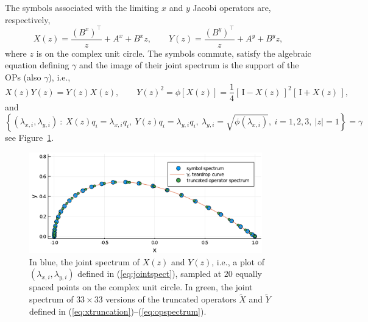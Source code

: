 \documentclass[12pt,a4paper]{article}
\begin{document}
The symbols associated with the limiting $x$ and $y$ Jacobi operators are, respectively,
\begin{equation*}
X(z) = \frac{\left(B^x\right)^{\intercal}}{z} + A^x + B^x z, \qquad
Y(z) = \frac{\left(B^y\right)^{\intercal}}{z} + A^y + B^y z, 
\end{equation*}
where $z$ is on the complex unit circle. The symbols commute, satisfy the algebraic equation defining $\gamma$ and the image of their joint spectrum is the support of the OPs (also $\gamma$), i.e., 
\begin{equation*}
X(z)Y(z) = Y(z)X(z), \qquad Y(z)^2 = \phi\left[X(z) \right] = \frac{1}{4}\left[\,\mathrm{I} - X(z)\,\right]^2\left[\,\mathrm{I} + X(z)\,\right],
\end{equation*}
and
\begin{equation}
\left\lbrace (\lambda_{x,i}, \lambda_{y,i}) \: : \:  X(z)q_i = \lambda_{x,i} q_i, \: Y(z)q_i = \lambda_{y,i} q_i, \: \lambda_{y,i} = \sqrt{\phi(\lambda_{x,i})}, \: i = 1, 2, 3,\: \vert z \vert = 1 \right\rbrace = \gamma
\label{eq:jointspect}
\end{equation}
see Figure~\ref{fig:symbolspectrum}.
\begin{figure}
	\centering
	\includegraphics[width = 0.9\textwidth]{symbol_spectrum2.pdf}
	\caption{In blue, the joint spectrum of $X(z)$ and $Y(z)$, i.e., a plot of $(\lambda_{x,i}, \lambda_{y,i})$ defined in (\ref{eq:jointspect}), sampled at $20$ equally spaced points on the complex unit circle. In green, the joint spectrum of $33 \times 33$ versions of the truncated operators $\widetilde{X}$ and $\widetilde{Y}$ defined in (\ref{eq:xtruncation})--(\ref{eq:opspectrum}).   }   
	\label{fig:symbolspectrum}
\end{figure}
\end{document}
